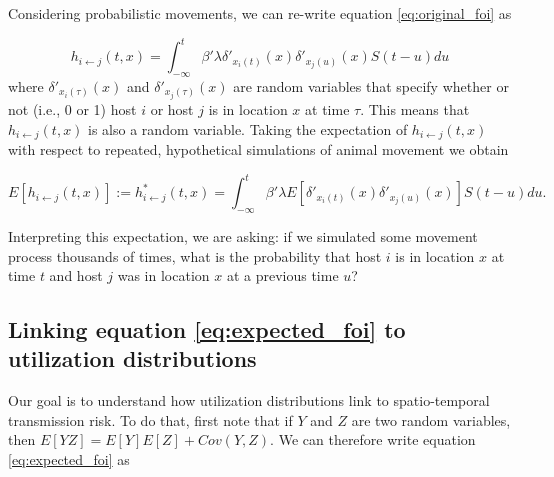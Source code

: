 \documentclass[letterpaper]{article}
\begin{document}
Considering probabilistic movements, we can re-write equation \ref{eq:original_foi} as

\begin{equation}
    h_{i \leftarrow j}(t, x) = \int_{-\infty}^{t} \beta' \lambda \delta'_{x_i(t)}(x) \delta'_{x_j(u)}(x) S(t - u) du
    \label{eq:prob_foi}
\end{equation}
where $\delta'_{x_i(\tau)}(x)$ and $\delta'_{x_j(\tau)}(x)$ are random variables that specify whether or not (i.e., 0 or 1) host $i$ or host $j$ is in location $x$ at time $\tau$.  This means that $h_{i \leftarrow j}(t, x)$ is also a random variable. 
Taking the expectation of $h_{i \leftarrow j}(t, x)$ with respect to repeated, hypothetical simulations of animal movement we obtain

\begin{equation}
    E[h_{i \leftarrow j}(t, x)] := h^*_{i \leftarrow j}(t, x) = \int_{-\infty}^{t} \beta' \lambda E[\delta'_{x_i(t)}(x) \delta'_{x_j(u)}(x)] S(t - u) du.
    \label{eq:expected_foi}
\end{equation}

Interpreting this expectation, we are asking: if we simulated some movement process thousands of times, what is the probability that host $i$ is in location $x$ at time $t$ and host $j$ was in location $x$ at a previous time $u$? 

\subsection*{Linking equation \ref{eq:expected_foi} to utilization distributions}

Our goal is to understand how utilization distributions link to spatio-temporal transmission risk.  To do that, first note that if $Y$ and $Z$ are two random variables, then $E[YZ] = E[Y]E[Z] + Cov(Y, Z)$.  We can therefore write equation \ref{eq:expected_foi} as
\end{document}
